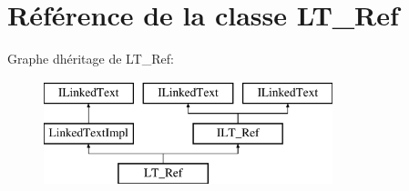 \hypertarget{class_l_t___ref}{}\section{Référence de la classe L\+T\+\_\+\+Ref}
\label{class_l_t___ref}
Graphe d\textquotesingle{}héritage de L\+T\+\_\+\+Ref\+:\begin{figure}[H]
\begin{center}
\leavevmode
\includegraphics[height=3.000000cm]{class_l_t___ref}
\end{center}
\end{figure}
